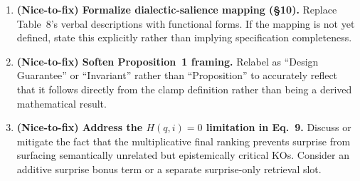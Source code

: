 \documentclass[11pt,a4paper]{article}
\begin{document}
\begin{enumerate}[label=\textbf{R\arabic*.}, leftmargin=2em]
\item \textbf{(Nice-to-fix) Formalize dialectic-salience mapping (\S10).}
Replace Table~8's verbal descriptions with functional forms. If the mapping is not yet defined, state this explicitly rather than implying specification completeness.

\item \textbf{(Nice-to-fix) Soften Proposition~1 framing.}
Relabel as ``Design Guarantee'' or ``Invariant'' rather than ``Proposition'' to accurately reflect that it follows directly from the clamp definition rather than being a derived mathematical result.

\item \textbf{(Nice-to-fix) Address the $H(q,i) = 0$ limitation in Eq.~9.}
Discuss or mitigate the fact that the multiplicative final ranking prevents surprise from surfacing semantically unrelated but epistemically critical KOs. Consider an additive surprise bonus term or a separate surprise-only retrieval slot.

\end{enumerate}
\end{document}
